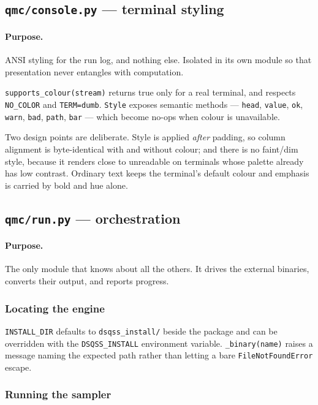 \documentclass[11pt,a4paper]{article}
\newcommand{\code}[1]{\texttt{#1}}
\newcommand{\file}[1]{\texttt{\textbf{#1}}}
\begin{document}
\subsection{\file{qmc/console.py} --- terminal styling}

\paragraph{Purpose.} ANSI styling for the run log, and nothing else. Isolated in
its own module so that presentation never entangles with computation.

\code{supports\_colour(stream)} returns true only for a real terminal, and
respects \code{NO\_COLOR} and \code{TERM=dumb}. \code{Style} exposes semantic
methods --- \code{head}, \code{value}, \code{ok}, \code{warn}, \code{bad},
\code{path}, \code{bar} --- which become no-ops when colour is unavailable.

Two design points are deliberate. Style is applied \emph{after} padding, so
column alignment is byte-identical with and without colour; and there is no
faint/dim style, because it renders close to unreadable on terminals whose
palette already has low contrast. Ordinary text keeps the terminal's default
colour and emphasis is carried by bold and hue alone.

\subsection{\file{qmc/run.py} --- orchestration}

\paragraph{Purpose.} The only module that knows about all the others. It drives
the external binaries, converts their output, and reports progress.

\subsubsection*{Locating the engine}

\code{INSTALL\_DIR} defaults to \code{dsqss\_install/} beside the package and can
be overridden with the \code{DSQSS\_INSTALL} environment variable.
\code{\_binary(name)} raises a message naming the expected path rather than
letting a bare \code{FileNotFoundError} escape.

\subsubsection*{Running the sampler}
\end{document}
